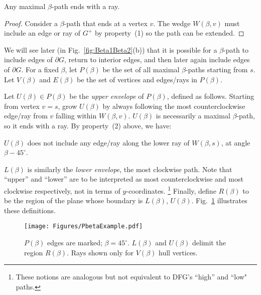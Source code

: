 \documentclass{cccg17}
\newcommand{\bluenew}[1]{{#1}}  %
\newcommand{\rednote}[1]{{}}  %
\newcommand{\lemlab}[1]{\label{lemma:#1}}
\newcommand{\figlab}[1]{\label{fig:#1}}
\newcommand{\figref}[1]{\ref{fig:#1}}
\def\b{{\beta}}
\def\bG{{\partial G}}
\begin{document}
\begin{lemma}
Any maximal $\b$-path ends with a ray.
\lemlab{maximal-beta}
\end{lemma}
\begin{proof}
Consider a $\b$-path that ends at a vertex $v$.  The wedge $W(\b, v)$ must include an edge or ray of $G^+$ by property~(1) so the path can be extended.   
\end{proof}


\medskip
\noindent
We will see later (in \bluenew{Fig.~\figref{Beta1Beta2}(b))}
\rednote{JOR: Only illustrated in (b).}
that it is possible for a $\b$-path to 
include edges of $\bG$, %
\rednote{Rev1: and that those boundary edges may even form multiple subpaths. ``Not clear what you mean by this."
JOR: Agree, too terse. Attempted fix:}
\bluenew{return to interior edges, and then later again include edges of $\bG$}.
For a fixed $\b$, let $P(\b)$ be the set of all maximal $\b$-paths starting from $s$.
Let $V(\b)$ and $E(\b)$ be the set of vertices and edges/rays in $P(\b)$.

Let $U(\b) \in P(\b)$ be the 
\emph{upper envelope} of $P(\b)$,
defined as follows.
Starting from vertex $v=s$,  grow \bluenew{$U(\b)$} %
by always following
the most counterclockwise edge/ray from $v$ falling within $W(\b,v)$.
$U(\b)$ is necessarily a maximal $\b$-path, so it ends with a ray.  By property~(2) above, we have:


\begin{obs}
$U(\b)$ does not include any edge/ray along the lower ray of \bluenew{$W(\b,s)$}, at angle $\b - 45^\circ$.
\label{obs:no-lower}
\end{obs}


$L(\b)$ is similarly the \emph{lower envelope}, the most clockwise path.
Note that ``upper'' and ``lower'' are to be interpreted 
as most counterclockwise and most clockwise respectively, not in terms of $y$-coordinates.%
\footnote{These notions are analogous but not equivalent to DFG's ``high'' and ``low" paths.}
Finally, define $R(\b)$ to be the region of the plane whose boundary is $L(\b)$, $U(\b)$.
Fig.~\figref{PbetaExample} illustrates these definitions.
\begin{figure}[htbp]
\centering
\texttt{[image: Figures/PbetaExample.pdf]}
\caption{$P(\b)$ edges are marked; $\b=45^\circ$.
$L(\b)$ and $U(\b)$ delimit the region $R(\b)$.
Rays shown only for $V(\b)$ hull vertices.
}
\figlab{PbetaExample}
\end{figure}
\end{document}
